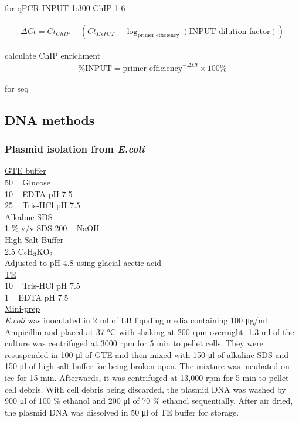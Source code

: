 for qPCR
INPUT 1:300
ChIP 1:6

\begin{align*}
    \Delta Ct = Ct_{ChIP} - (Ct_{INPUT} - \log_{\text{primer efficiency}} (\text{{INPUT dilution factor}}))
\end{align*}

calculate ChIP enrichment
\begin{align*}
    \text{\%INPUT} = \text{primer efficiency}^{-\Delta Ct} \times 100 \%
\end{align*}

for seq

\subsection{DNA methods}
\subsubsection{Plasmid isolation from \textit{E.coli}}

\underline{GTE buffer}\\
50 \si{\milli\Molar} Glucose \\
10 \si{\milli\Molar} EDTA pH 7.5 \\
25 \si{\milli\Molar} Tris-HCl pH 7.5 \\

\underline{Alkaline SDS}\\
 1 \% v/v SDS
200 \si{\milli\Molar} NaOH\\

\underline{High Salt Buffer}\\
2.5 \si{\Molar} C$_{2}$H$_{3}$KO$_{2}$ \\
Adjusted to pH 4.8 using glacial acetic acid\\

\underline{TE}\\
10 \si{\milli\Molar} Tris-HCl pH 7.5\\
1 \si{\milli\Molar} EDTA pH 7.5\\

\underline{Mini-prep}\\
\textit{E.coli} was inoculated in 2 \si{\milli\litre} of LB liquding media containing 100 \si{\micro\gram/\milli\litre} Ampicillin and placed at 37 \si{\celsius} with shaking at 200 rpm overnight. 1.3 \si{\milli\litre} of the culture was centrifuged at 3000 rpm for 5 \si{\minute} to pellet cells. They were resuspended in 100 \si{\micro\litre} of GTE and then mixed with 150 \si{\micro\litre} of alkaline SDS and 150 \si{\micro\litre} of high salt buffer for being broken open. The mixture was incubated on ice for 15 \si{\minute}. Afterwards, it was centrifuged at 13,000 rpm for 5 \si{\minute} to pellet cell debris. With cell debris being discarded, the plasmid DNA was washed by 900 \si{\micro\litre} of 100 \% ethanol and 200 \si{\micro\litre} of 70 \% ethanol sequentially. After air dried, the plasmid DNA was dissolved in 50 \si{\micro\litre} of TE buffer for storage. \\


